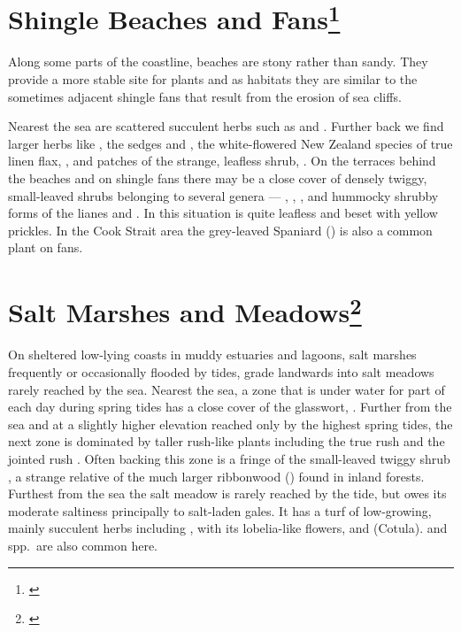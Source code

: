 \section[Shingle Beaches and Fans]{Shingle Beaches and Fans\footnote{\cite{moore1963plants}}}

Along some parts of the coastline, beaches are stony rather than sandy.
They provide a more stable site for plants and as habitats they are similar to the sometimes adjacent shingle fans that result from the erosion of sea cliffs.

Nearest the sea are scattered succulent herbs such as  and .
Further back we find larger herbs like , the sedges  and , the white-flowered New Zealand species of true linen flax, , and patches of the strange, leafless shrub, .
On the terraces behind the beaches and on shingle fans there may be a close cover of densely twiggy, small-leaved shrubs belonging to several genera --- , ,  ,   and hummocky shrubby forms of the lianes  and .
In this situation  is quite leafless and beset with yellow prickles.
In the Cook Strait area the grey-leaved Spaniard () is also a common plant on fans.

\section[Salt Marshes and Meadows]{Salt Marshes and Meadows\footnote{\cite{moore1963plants}}}

On sheltered low-lying coasts in muddy estuaries and lagoons, salt marshes frequently or occasionally flooded by tides, grade landwards into salt meadows rarely reached by the sea.
Nearest the sea, a zone that is under water for part of each day during spring tides has a close cover of the glasswort, .
Further from the sea and at a slightly higher elevation reached only by the highest spring tides, the next zone is dominated by taller rush-like plants including the true rush  and the jointed rush .
Often backing this zone is a fringe of the small-leaved twiggy shrub , a strange relative of the much larger ribbonwood () found in inland forests.
Furthest from the sea the salt meadow is rarely reached by the tide, but owes its moderate saltiness principally to salt-laden gales.
It has a turf of low-growing, mainly succulent herbs including ,  with its lobelia-like flowers,  and  (Cotula).  and  spp.\ are also common here.

